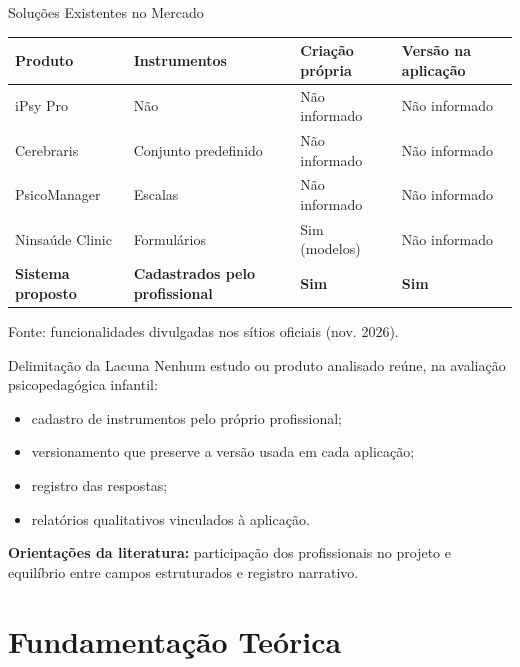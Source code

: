 \documentclass[compress]{beamer}
\begin{document}
\begin{frame}{Soluções Existentes no Mercado}
\footnotesize
\centering
\begin{tabular}{p{2.1cm}p{3.0cm}p{2.0cm}p{2.0cm}}
\toprule
\textbf{Produto} & \textbf{Instrumentos} & \textbf{Criação própria} & \textbf{Versão na aplicação} \\
\midrule
iPsy Pro & Não & Não informado & Não informado \\
Cerebraris & Conjunto predefinido & Não informado & Não informado \\
PsicoManager & Escalas & Não informado & Não informado \\
Ninsaúde Clinic & Formulários & Sim (modelos) & Não informado \\
\midrule
\textbf{Sistema proposto} & \textbf{Cadastrados pelo profissional} & \textbf{Sim} & \textbf{Sim} \\
\bottomrule
\end{tabular}

\vspace{0.4cm}
\raggedright
\small Fonte: funcionalidades divulgadas nos sítios oficiais (nov. 2026).
\end{frame}

\begin{frame}{Delimitação da Lacuna}
Nenhum estudo ou produto analisado reúne, na avaliação psicopedagógica infantil:
\begin{itemize}
    \item cadastro de instrumentos pelo próprio profissional;
    \item versionamento que preserve a versão usada em cada aplicação;
    \item registro das respostas;
    \item relatórios qualitativos vinculados à aplicação.
\end{itemize}
\vspace{0.3cm}
\textbf{Orientações da literatura:} participação dos profissionais no projeto e equilíbrio entre campos estruturados e registro narrativo.
\end{frame}

\section{Fundamentação Teórica}
\end{document}
